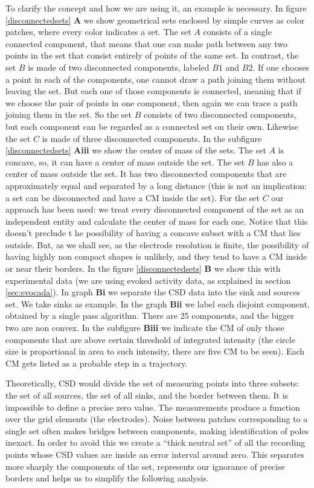 \documentclass[utf8]{frontiersSCNS}
\begin{document}
To clarify the concept and how we are using it, an example is necessary. In figure \ref{disconnectedsets} \textbf{A} we show geometrical sets enclosed by simple curves as color patches, where every color indicates a set. The set $A$ consists of a single connected component, that means that one can make  path between any two points in the set that consist entirely of points of the same set. In contrast, the set $B$ is made of two disconnected components, labeled $B1$ and $B2$. If one chooses a point in each of the components, one cannot draw a path joining them without leaving the set. But each one of those components is connected, meaning that if we choose the pair of points in one component, then again we can trace a path joining them in the set. So the set $B$ consists of two disconnected components, but each component can be regarded as a connected set on their own. Likewise the set $C$ is made of three disconnected components. In the subfigure \ref{disconnectedsets} \textbf{Aiii} we show the center of mass of the sets. The set $A$ is concave, so, it can have a center of mass outside the set. The
set $B$ has also a center of mass outside the set. It has two disconnected components that are approximately
equal and separated by a long distance (this is not an implication: a set can be disconnected and have
a CM inside the set). For the set $C$ our approach has been used: we treat every disconnected component of the
set as an independent entity and calculate the center of mass for each one. Notice that this doesn't preclude t
he possibility of having a concave subset with a CM that lies outside. But, as we shall see,
as the electrode resolution is finite, the possibility of having highly non compact shapes is unlikely, and they
tend to have a CM inside or near their borders. In the figure \ref{disconnectedsets}
\textbf{B} we show this with experimental
data (we are using evoked activity data, as explained in section \ref{sec:evocada}). In graph
\textbf{Bi} we
separate the CSD data into the sink and sources set. We take sinks as example. In the graph
\textbf{Bii}
we label each disjoint component, obtained by a single pass algorithm. There are 25 components, and
the bigger two are non convex. In the
subfigure \textbf{Biii}
we indicate the CM of only those components that are above certain threshold of
integrated intensity (the circle size  is proportional in area to such intensity, there are five CM to be
seen). Each CM gets listed as a probable step in a trajectory.



Theoretically, CSD would divide the set of measuring points into three subsets: the set of all sources, the set of all sinks, and the border between them.
It is impossible to define a precise zero value.
The measurements produce a function over the grid elements (the electrodes).
Noise between patches corresponding to a single set often makes bridges
between components, making identification of poles inexact.
In order to avoid this we create a ``thick neutral set'' of all the recording
points whose CSD values are inside an error interval around zero.
This separates more sharply the components of the set,
represents our ignorance of precise borders and helps
us to simplify the following analysis.
\end{document}
